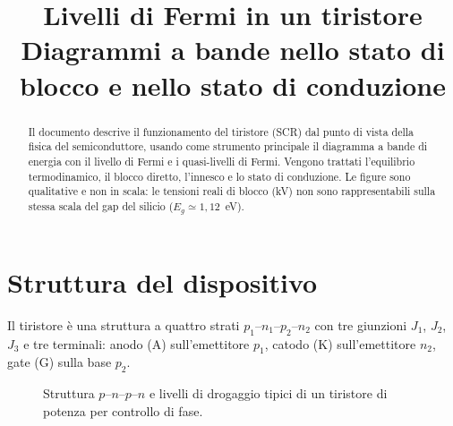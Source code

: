 \documentclass[11pt,a4paper]{article}
\title{\bfseries Livelli di Fermi in un tiristore\\[2mm]
\large Diagrammi a bande nello stato di blocco e nello stato di conduzione}
\author{}
\date{}
\begin{document}
\maketitle
\vspace{-12mm}

\begin{abstract}
\noindent
Il documento descrive il funzionamento del tiristore (SCR) dal punto di vista della
fisica del semiconduttore, usando come strumento principale il diagramma a bande di
energia con il livello di Fermi e i quasi-livelli di Fermi. Vengono trattati
l'equilibrio termodinamico, il blocco diretto, l'innesco e lo stato di conduzione.
Le figure sono qualitative e non in scala: le tensioni reali di blocco (kV)
non sono rappresentabili sulla stessa scala del gap del silicio ($E_g \simeq 1{,}12$~eV).
\end{abstract}

\section{Struttura del dispositivo}

Il tiristore è una struttura a quattro strati $p_1$--$n_1$--$p_2$--$n_2$ con tre
giunzioni $J_1$, $J_2$, $J_3$ e tre terminali: anodo (A) sull'emettitore $p_1$,
catodo (K) sull'emettitore $n_2$, gate (G) sulla base $p_2$.

\begin{figure}[h]
\centering
{}
\caption{Struttura $p$--$n$--$p$--$n$ e livelli di drogaggio tipici di un tiristore
di potenza per controllo di fase.}
\end{figure}
\end{document}
